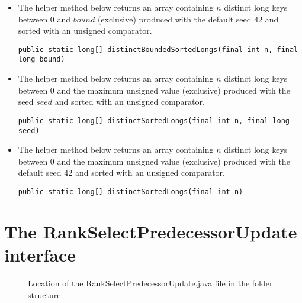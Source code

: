 \begin{itemize}
    \item
    The helper method below returns an array containing $n$ distinct {\ttfamily long} keys between 0 and $bound$ (exclusive) produced with the default seed $42$ and sorted with an unsigned comparator.
    \begin{lstlisting}
public static long[] distinctBoundedSortedLongs(final int n, final long bound)
    \end{lstlisting}
    
    \item
    The helper method below returns an array containing $n$ distinct {\ttfamily long} keys between 0 and the maximum unsigned value (exclusive) produced with the seed $seed$ and sorted with an unsigned comparator.
    \begin{lstlisting}
public static long[] distinctSortedLongs(final int n, final long seed)
    \end{lstlisting}
    
    \item
    The helper method below returns an array containing $n$ distinct {\ttfamily long} keys between 0 and the maximum unsigned value (exclusive) produced with the default seed $42$ and sorted with an unsigned comparator.
    \begin{lstlisting}
public static long[] distinctSortedLongs(final int n)
    \end{lstlisting}
\end{itemize}

\newpage
\section{The {\ttfamily RankSelectPredecessorUpdate} interface}

\begin{figure}[H]
\caption{Location of the {\ttfamily RankSelectPredecessorUpdate.java} file in the folder structure}
\label{fig:RankSelectPredecessorUpdateTree}
\end{figure}

